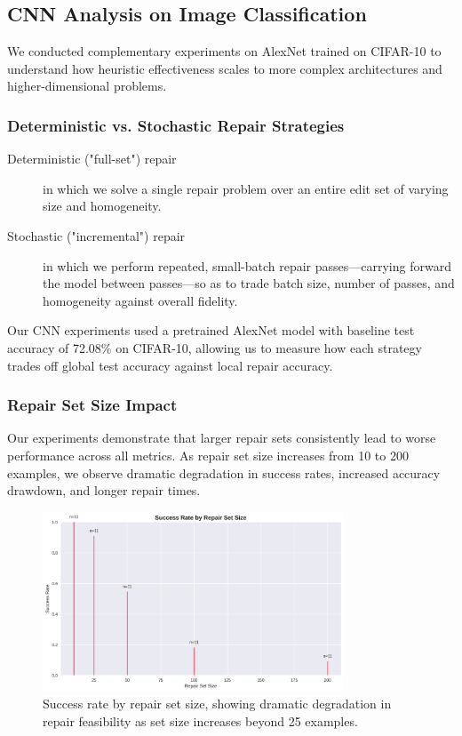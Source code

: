 \documentclass{article}
\begin{document}
\subsection{CNN Analysis on Image Classification}

We conducted complementary experiments on AlexNet trained on CIFAR-10 to understand how heuristic effectiveness scales to more complex architectures and higher-dimensional problems.

\subsubsection{Deterministic vs. Stochastic Repair Strategies}

\begin{description}
	\item[Deterministic ("full-set") repair] in which we solve a single repair problem over an entire edit set of varying size and homogeneity.
	\item[Stochastic ("incremental") repair] in which we perform repeated, small-batch repair passes—carrying forward the model between passes—so as to trade batch size, number of passes, and homogeneity against overall fidelity.
\end{description}

Our CNN experiments used a pretrained AlexNet model with baseline test accuracy of 72.08\% on CIFAR-10, allowing us to measure how each strategy trades off global test accuracy against local repair accuracy.

\subsubsection{Repair Set Size Impact}

Our experiments demonstrate that larger repair sets consistently lead to worse performance across all metrics. As repair set size increases from 10 to 200 examples, we observe dramatic degradation in success rates, increased accuracy drawdown, and longer repair times.

\begin{figure}[h]
	\centering
	\includegraphics[width=0.8\textwidth]{results/one_shot_analysis/success_rates/success_rate_by_size.png}
	\caption{Success rate by repair set size, showing dramatic degradation in repair feasibility as set size increases beyond 25 examples.}
	\label{fig:success_rate_by_size}
\end{figure}
\end{document}
